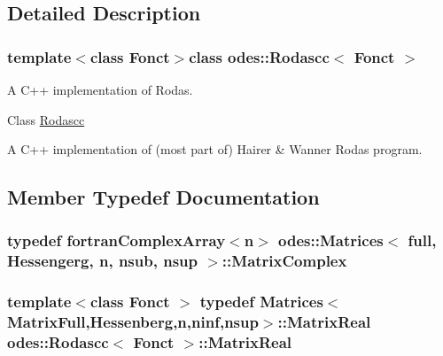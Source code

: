 \subsection{Detailed Description}
\subsubsection*{template$<$class Fonct$>$class odes\-::\-Rodascc$<$ Fonct $>$}

A C++ implementation of Rodas. 

Class \hyperlink{classodes_1_1Rodascc}{Rodascc}

A C++ implementation of (most part of) Hairer \& Wanner Rodas program. 

\subsection{Member Typedef Documentation}
\hypertarget{classodes_1_1Matrices_aa1313b5ab7fdab6f5320c8d5aa3bfc24}{
\subsubsection[{Matrix\-Complex}]{\setlength{\rightskip}{0pt plus 5cm}typedef {\bf fortran\-Complex\-Array}$<${\bf n}$>$ {\bf odes\-::\-Matrices}$<$ full, Hessengerg, {\bf n}, nsub, {\bf nsup} $>$\-::{\bf Matrix\-Complex}\hspace{0.3cm}{\ttfamily [inherited]}}}\label{classodes_1_1Matrices_aa1313b5ab7fdab6f5320c8d5aa3bfc24}
\hypertarget{classodes_1_1Rodascc_a60e15e5d87729cc221d2181ecf03d0f8}{
\subsubsection[{Matrix\-Real}]{\setlength{\rightskip}{0pt plus 5cm}template$<$class Fonct $>$ typedef {\bf Matrices}$<${\bf Matrix\-Full},{\bf Hessenberg},{\bf n},{\bf ninf},{\bf nsup}$>$\-::{\bf Matrix\-Real} {\bf odes\-::\-Rodascc}$<$ Fonct $>$\-::{\bf Matrix\-Real}\hspace{0.3cm}{\ttfamily [private]}}}\label{classodes_1_1Rodascc_a60e15e5d87729cc221d2181ecf03d0f8}


